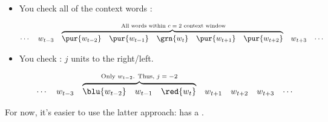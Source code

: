         \begin{itemize}
            \item You check all of the context words :

            \begin{equation}
                \begin{matrix}
                    \cdots & w_{t-3} & 
                    \overbrace{
                    \begin{matrix}
                        \pur{w_{t-2}} & \pur{w_{t-1}} & \grn{w_t} & \pur{w_{t+1}} & \pur{w_{t+2}}
                    \end{matrix} 
                    }^{\text{ All words within $c=2$ context window}}
                    & w_{t+3} & \cdots
                \end{matrix}
            \end{equation}

            \item You check : $j$ units to the right/left.

            \begin{equation}
                \begin{matrix}
                    \cdots & w_{t-3} & 
                    \overbrace{
                    \begin{matrix}
                        \blu{w_{t-2}} & w_{t-1} & \red{w_t} 
                    \end{matrix} 
                    }^{\text{Only $w_{t-2}$. Thus, $j=-2$}}
                    & w_{t+1} & w_{t+2}
                    & w_{t+3} & \cdots
                \end{matrix}
            \end{equation}
        \end{itemize}

        For now, it's easier to use the latter approach:  has a .\\

